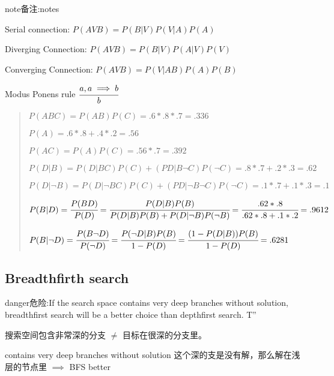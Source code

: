 \documentclass[letterpaper,10pt,english]{sphinxmanual}
\begin{document}
\begin{sphinxadmonition}{note}{备注:}{notes}

\begin{DUlineblock}{0em}
\item[] Serial connection:      \(P(AVB)=P(B|V)P(V|A)P(A)\)
\item[] Diverging Connection:   \(P(AVB)=P(B|V)P(A|V)P(V)\)
\item[] Converging Connection: \(P(AVB)=P(V|AB)P(A)P(B)\)
\item[] Modus Ponens rule \(\cfrac{a,a\implies b}{b}\)
\end{DUlineblock}
\end{sphinxadmonition}
\begin{quote}

\noindent{}

\begin{DUlineblock}{0em}
\item[] \(P(ABC)=P(AB)P(C)=.6*.8*.7=.336\)
\item[] \(P(A)=.6*.8+.4*.2=.56\)
\item[] \(P(AC)=P(A)P(C)=.56*.7=.392\)
\item[] \(P(D|B)=P(D|BC)P(C)+(PD|B\neg C)P(\neg C)=.8*.7+.2*.3=.62\)
\item[] \(P(D|\neg B)=P(D|\neg BC)P(C)+(PD|\neg B\neg C)P(\neg C)=.1*.7+.1*.3=.1\)
\item[] \(P(B|D)=\cfrac{P(BD)}{P(D)}=\cfrac{P(D|B)P(B)}{P(D|B)P(B)+P(D|\neg B)P(\neg B)}=\cfrac{.62*.8}{.62*.8+.1*.2}=.9612\)
\item[] \(P(B|\neg D)=\cfrac{P(B\neg D)}{P(\neg D)}=\cfrac{P(\neg D|B)P(B)}{1-P(D)}=\cfrac{(1-P(D|B))P(B)}{1-P(D)}=.6281\)
\end{DUlineblock}
\end{quote}


\subsection{Breadth\sphinxhyphen{}firth search}
\label{\detokenize{AI/main:breadth-firth-search}}
\begin{sphinxadmonition}{danger}{危险:}{If the search space contains very deep branches without solution, breadth\sphinxhyphen{}first search will be a better choice than depth\sphinxhyphen{}first search.  T”}

\begin{DUlineblock}{0em}
\item[] 搜索空间包含非常深的分支 \(\neq\) 目标在很深的分支里。
\item[] contains very deep branches without solution 这个深的支是没有解，那么解在浅层的节点里 \(\implies\) BFS better
\end{DUlineblock}
\end{sphinxadmonition}
\end{document}
